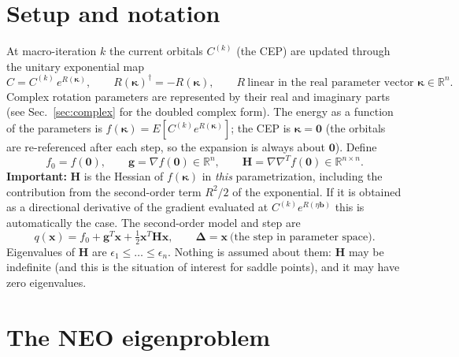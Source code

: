 \documentclass[11pt,a4paper]{article}
\newcommand{\bH}{\mathbf{H}}
\newcommand{\bg}{\mathbf{g}}
\newcommand{\bx}{\mathbf{x}}
\newcommand{\bb}{\mathbf{b}}
\newcommand{\bd}{\boldsymbol{\Delta}}
\newcommand{\bk}{\boldsymbol{\kappa}}
\begin{document}
\section{Setup and notation}
At macro-iteration $k$ the current orbitals $C^{(k)}$ (the CEP) are updated through the unitary exponential map
\begin{equation}
 C=C^{(k)}\,e^{R(\bk)},\qquad R(\bk)^\dagger=-R(\bk),\qquad R\ \text{linear in the real parameter vector }\bk\in\mathbb R^n .
\end{equation}
Complex rotation parameters are represented by their real and imaginary parts (see Sec.~\ref{sec:complex} for the doubled complex form).
The energy as a function of the parameters is $f(\bk)=E[C^{(k)}e^{R(\bk)}]$; the CEP is $\bk=\mathbf 0$ (the orbitals are re-referenced after each step, so the expansion is always about $\mathbf 0$).
Define
\begin{equation}
 f_0=f(\mathbf 0),\qquad \bg=\nabla f(\mathbf 0)\in\mathbb R^n,\qquad \bH=\nabla\nabla^Tf(\mathbf 0)\in\mathbb R^{n\times n}.
\end{equation}
\textbf{Important:} $\bH$ is the Hessian of $f(\bk)$ in \emph{this} parametrization, including the contribution from the second-order term $R^2/2$ of the exponential.
If it is obtained as a directional derivative of the gradient evaluated at $C^{(k)}e^{R(\eta\bb)}$ this is automatically the case.
The second-order model and step are
\begin{equation}
 q(\bx)=f_0+\bg^T\bx+\tfrac12\bx^T\bH\bx,\qquad \bd=\bx\ \text{(the step in parameter space)}.
\end{equation}
Eigenvalues of $\bH$ are $\epsilon_1\le\dots\le\epsilon_n$. Nothing is assumed about them: $\bH$ may be indefinite (and this is the situation of interest for saddle points), and it may have zero eigenvalues.

\section{The NEO eigenproblem}
\end{document}
